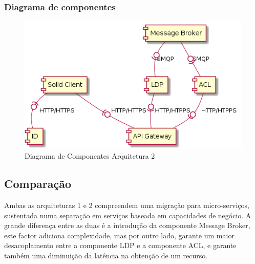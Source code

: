 \subsubsection{Diagrama de componentes}
\begin{figure}[h]
    \begin{center}
    \includegraphics[width=1 \textwidth]{figures/component_diagram.png}
    \caption{Diagrama de Componentes Arquitetura 2}
    \end{center}
\end{figure}

\subsection{Comparação}

Ambas as arquiteturas 1 e 2 compreendem uma migração para micro-serviços, sustentada numa separação em serviços baseada em capacidades de negócio.
A grande diferença entre as duas é a introdução da componente Message Broker, este factor adiciona complexidade, mas por outro lado, garante um maior desacoplamento entre a componente LDP e a componente ACL, e garante também uma diminuição da latência na obtenção de um recurso.





